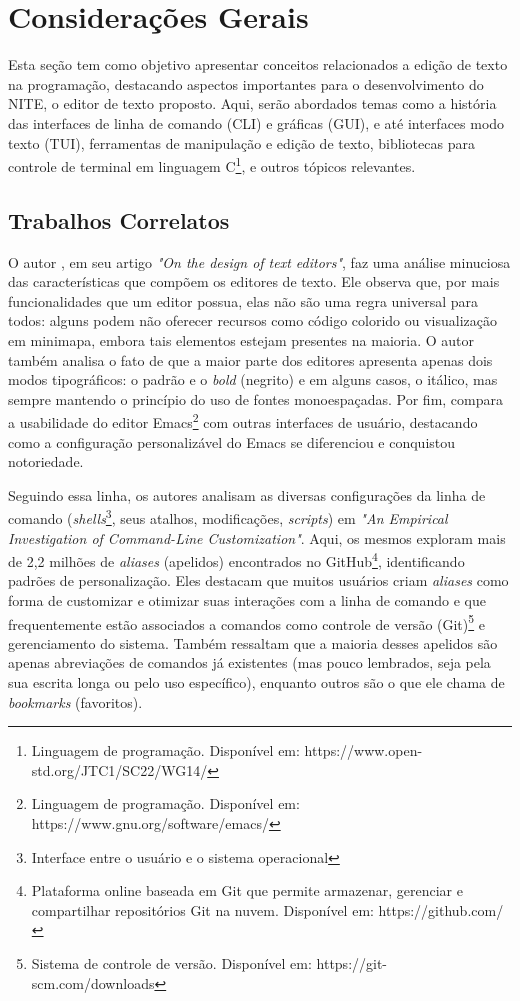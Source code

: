\chapter{Considerações Gerais}
\label{cap:02}

Esta seção tem como objetivo apresentar conceitos relacionados a edição de texto
na programação, destacando aspectos importantes para o desenvolvimento do NITE,
o editor de texto proposto. Aqui, serão abordados temas como a história das
interfaces de linha de comando (CLI) e gráficas (GUI), e até interfaces modo texto
(TUI), ferramentas de manipulação e edição de texto, bibliotecas para controle de
terminal em linguagem C\footnote{Linguagem de programação. Disponível em: https://www.open-std.org/JTC1/SC22/WG14/},
e outros tópicos relevantes.

\section{Trabalhos Correlatos}

O autor \cite{Rougier2020Editors}, em seu artigo \textit{"On the design of text editors"},
faz uma análise minuciosa das características que compõem os editores de texto.
Ele observa que, por mais funcionalidades que um editor possua, elas não são uma
regra universal para todos: alguns podem não oferecer recursos como código colorido
ou visualização em minimapa, embora tais elementos estejam presentes na maioria.
O autor também analisa o fato de que a maior parte dos editores apresenta apenas
dois modos tipográficos: o padrão e o \textit{bold} (negrito) e em alguns casos,
o itálico, mas sempre mantendo o princípio do uso de fontes monoespaçadas. Por
fim, compara a usabilidade do editor Emacs\footnote{Linguagem de programação. Disponível
em: https://www.gnu.org/software/emacs/} com outras interfaces de usuário, destacando
como a configuração personalizável do Emacs se diferenciou e conquistou notoriedade.

Seguindo essa linha, os autores \cite{SchroderCito2022} analisam as diversas
configurações da linha de comando (\textit{shells}\footnote{Interface entre o
usuário e o sistema operacional}, seus atalhos, modificações, \textit{scripts})
em \textit{"An Empirical Investigation of Command-Line Customization"}. Aqui, os
mesmos exploram mais de 2,2 milhões de \textit{aliases} (apelidos) encontrados
no GitHub\footnote{Plataforma online baseada em Git que permite armazenar, gerenciar
e compartilhar repositórios Git na nuvem. Disponível em: https://github.com/},
identificando padrões de personalização. Eles destacam que muitos usuários criam
\textit{aliases} como forma de customizar e otimizar suas interações com a linha
de comando e que frequentemente estão associados a comandos como controle de
versão (Git)\footnote{Sistema de controle de versão. Disponível em: https://git-scm.com/downloads}
e gerenciamento do sistema. Também ressaltam que a maioria desses apelidos são
apenas abreviações de comandos já existentes (mas pouco lembrados, seja pela sua
escrita longa ou pelo uso específico), enquanto outros são o que ele chama de
\textit{bookmarks} (favoritos).


